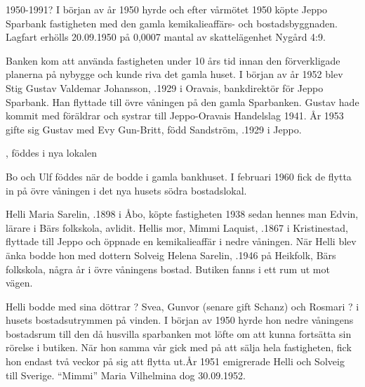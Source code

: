 1950-1991?
I början av år 1950 hyrde och efter vårmötet 1950 köpte Jeppo Sparbank fastigheten med den gamla kemikalieaffärs- och 	bostadsbyggnaden. Lagfart erhölls 20.09.1950 på 0,0007 mantal	av skattelägenhet Nygård 4:9.





Banken kom att använda fastigheten under 10 års tid innan den förverkligade planerna på nybygge och kunde riva det gamla huset. I början av år 1952 blev Stig Gustav Valdemar Johansson, .1929 i Oravais, bankdirektör för Jeppo Sparbank. Han flyttade till övre våningen på den gamla Sparbanken. Gustav hade kommit med föräldrar och systrar till Jeppo-Oravais Handelslag 1941. År 1953 gifte sig Gustav med Evy Gun-Britt, född Sandström, .1929 i Jeppo.
\begin{jhchildren}
  \item {}
  \item {}
  \item {}, föddes i nya lokalen
\end{jhchildren}
Bo och Ulf föddes när de bodde i gamla bankhuset. I februari 1960 fick de flytta in på övre våningen i det nya husets södra bostadslokal.


Helli Maria Sarelin, .1898 i Åbo, köpte fastigheten 1938 sedan hennes man Edvin, lärare i Bärs folkskola, avlidit. Hellis mor, Mimmi Laquist, .1867 i Kristinestad, flyttade till Jeppo och öppnade en kemikalieaffär i nedre våningen. När Helli blev änka bodde hon med dottern Solveig Helena Sarelin, .1946 på Heikfolk, Bärs folkskola, några år i övre våningens bostad. Butiken fanns i ett rum ut mot vägen.

Helli bodde med sina döttrar  ? Svea, Gunvor (senare gift Schanz) och Rosmari ? i husets bostadsutrymmen på vinden. I början av 1950 hyrde hon nedre våningens bostadsrum till den då husvilla sparbanken mot löfte om att kunna fortsätta sin rörelse i butiken. När hon samma vår gick med på att sälja hela fastigheten, fick hon endast två veckor på sig att flytta ut.År 1951 emigrerade Helli och Solveig till Sverige. ``Mimmi'' Maria Vilhelmina dog 30.09.1952.

